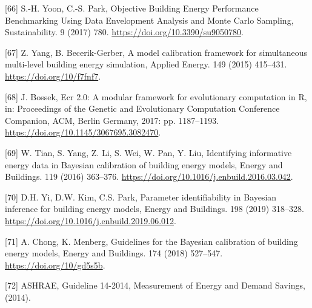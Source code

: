 \documentclass[3p, times]{elsarticle} %
\begin{document}
\leavevmode\hypertarget{ref-Yoon2017Objective}{}%
{[}66{]} S.-H. Yoon, C.-S. Park, Objective Building Energy Performance Benchmarking Using Data Envelopment Analysis and Monte Carlo Sampling, Sustainability. 9 (2017) 780. \url{https://doi.org/10.3390/su9050780}.

\leavevmode\hypertarget{ref-Yang2015c}{}%
{[}67{]} Z. Yang, B. Becerik-Gerber, A model calibration framework for simultaneous multi-level building energy simulation, Applied Energy. 149 (2015) 415--431. \url{https://doi.org/10/f7fnf7}.

\leavevmode\hypertarget{ref-Bossek2017}{}%
{[}68{]} J. Bossek, Ecr 2.0: A modular framework for evolutionary computation in R, in: Proceedings of the Genetic and Evolutionary Computation Conference Companion, ACM, Berlin Germany, 2017: pp. 1187--1193. \url{https://doi.org/10.1145/3067695.3082470}.

\leavevmode\hypertarget{ref-Tian2016Identifying}{}%
{[}69{]} W. Tian, S. Yang, Z. Li, S. Wei, W. Pan, Y. Liu, Identifying informative energy data in Bayesian calibration of building energy models, Energy and Buildings. 119 (2016) 363--376. \url{https://doi.org/10.1016/j.enbuild.2016.03.042}.

\leavevmode\hypertarget{ref-Yi2019Parameter}{}%
{[}70{]} D.H. Yi, D.W. Kim, C.S. Park, Parameter identifiability in Bayesian inference for building energy models, Energy and Buildings. 198 (2019) 318--328. \url{https://doi.org/10.1016/j.enbuild.2019.06.012}.

\leavevmode\hypertarget{ref-Chong2018}{}%
{[}71{]} A. Chong, K. Menberg, Guidelines for the Bayesian calibration of building energy models, Energy and Buildings. 174 (2018) 527--547. \url{https://doi.org/10/gd5s5b}.

\leavevmode\hypertarget{ref-ASHRAE2014}{}%
{[}72{]} ASHRAE, Guideline 14-2014, Measurement of Energy and Demand Savings, (2014).

\clearpage
\end{document}
